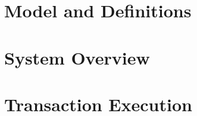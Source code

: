 \documentclass[letterpaper,twocolumn,10pt]{article}
\begin{document}
%

%
%
%
%

%
%

\section{Model and Definitions}
\label{section:model}

%





\section{System Overview}
\label{section:arch}



%
%



%


\section{Transaction Execution}
\label{section:exec}




\end{document}
